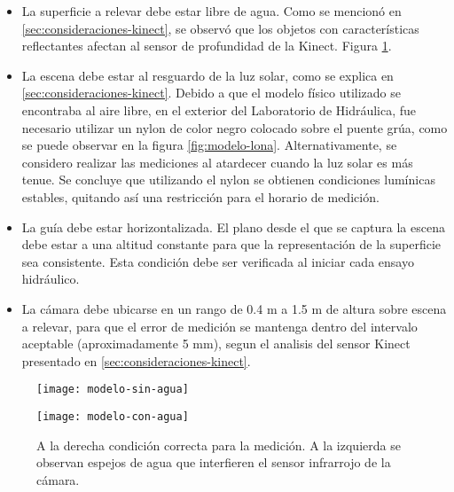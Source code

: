 \begin{itemize}

\item La superficie a relevar debe estar libre de agua. Como se mencionó en \ref{sec:consideraciones-kinect}, se observó que los objetos con características reflectantes afectan al sensor de profundidad de la Kinect. Figura \ref{fig:modelo-condiciones-agua}.

\item La escena debe estar al resguardo de la luz solar, como se explica en \ref{sec:consideraciones-kinect}. Debido a que el modelo físico utilizado se encontraba al aire libre, en el exterior del Laboratorio de Hidráulica, fue necesario utilizar un nylon de color negro colocado sobre el puente grúa, como se puede observar en la figura \ref{fig:modelo-lona}. Alternativamente, se considero realizar las mediciones al atardecer cuando la luz solar es más tenue. Se concluye que utilizando el nylon se obtienen condiciones lumínicas estables, quitando así una restricción para el horario de medición.

\item La guía debe estar horizontalizada. El plano desde el que se captura la escena debe estar a una altitud constante para que la representación de la superficie sea consistente. Esta condición debe ser verificada al iniciar cada ensayo hidráulico.

\item La cámara debe ubicarse en un rango de 0.4 m  a 1.5 m de altura sobre escena a relevar, para que el error de medición se mantenga dentro del intervalo aceptable (aproximadamente 5 mm), segun el analisis del sensor Kinect presentado en \ref{sec:consideraciones-kinect}.

\end{itemize}

\begin{figure}[h]
\centering
\begin{minipage}[t]{.45\textwidth}
\begin{center}
\texttt{[image: modelo-sin-agua]} %
\end{center}
\end{minipage}
\hfill
\begin{minipage}[t]{.45\textwidth}
\begin{center}
\texttt{[image: modelo-con-agua]} %
\end{center}
\end{minipage}
\hfill
\caption{A la derecha condición correcta para la medición. A la izquierda se observan espejos de agua que interfieren el sensor infrarrojo de la cámara.}
\label{fig:modelo-condiciones-agua}
\end{figure}


